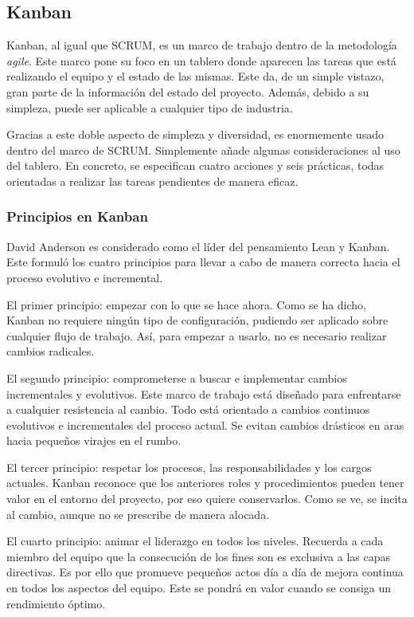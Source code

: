 \subsection{Kanban}
Kanban, al igual que SCRUM, es un marco de trabajo dentro de la metodología \textit{agile}. Este marco pone su foco en un tablero donde aparecen las tareas que está realizando el equipo y el estado de las mismas. Este da, de un simple vistazo, gran parte de la información del estado del proyecto. Además, debido a su simpleza, puede ser aplicable a cualquier tipo de industria.

Gracias a este doble aspecto de simpleza y diversidad, es enormemente usado dentro del marco de SCRUM. Simplemente añade algunas consideraciones al uso del tablero. En concreto, se especifican cuatro acciones y seis prácticas, todas orientadas a realizar las tareas pendientes de manera eficaz.

\subsubsection{Principios en Kanban}
David Anderson es considerado como el líder del pensamiento Lean y Kanban. Este formuló los cuatro principios para llevar a cabo de manera correcta hacia el proceso evolutivo e incremental.

El primer principio: empezar con lo que se hace ahora. Como se ha dicho, Kanban no requiere ningún tipo de configuración, pudiendo ser aplicado sobre cualquier flujo de trabajo. Así, para empezar a usarlo, no es necesario realizar cambios radicales.

El segundo principio: comprometerse a buscar e implementar cambios incrementales y evolutivos. Este marco de trabajo está diseñado para enfrentarse a cualquier resistencia al cambio. Todo está orientado a cambios continuos evolutivos e incrementales del proceso actual. Se evitan cambios drásticos en aras hacia pequeños virajes en el rumbo.

El tercer principio: respetar los procesos, las responsabilidades y los cargos actuales. Kanban reconoce que los anteriores roles y procedimientos pueden tener valor en el entorno del proyecto, por eso quiere conservarlos. Como se ve, se incita al cambio, aunque no se prescribe de manera alocada.

El cuarto principio: animar el liderazgo en todos los niveles. Recuerda a cada miembro del equipo que la consecución de los fines son es exclusiva a las capas directivas. Es por ello que promueve pequeños actos día a día de mejora continua en todos los aspectos del equipo. Este se pondrá en valor cuando se consiga un rendimiento óptimo.

